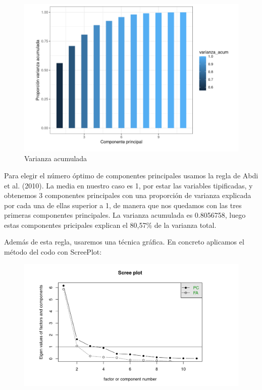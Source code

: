 \documentclass[11pt,a4paper]{article}
\begin{document}
    	         	\begin{figure}[H]
    	    \centering
    	    \includegraphics[scale=0.5]{varacum.png}
    	    \caption{Varianza acumulada}
    	    \label{varacum}
    	\end{figure}
    	
    	
    Para elegir el número óptimo de componentes principales usamos la regla de Abdi et al. (2010). La media en nuestro caso es 1, por estar las variables tipificadas, y obtenemos 3 componentes principales con una proporción de varianza explicada por cada una de ellas superior a 1, de manera que nos quedamos con las tres primeras componentes principales. La varianza acumulada es 0.8056758, luego estas componentes pricipales explican el 80,57\% de la varianza total. 
    
    Además de esta regla, usaremos una técnica gráfica. En concreto aplicamos el método del codo con ScreePlot: 
    
       	\begin{figure}[H]
    	    \centering
    	    \includegraphics[scale=0.4]{codo1.png}
    	    \caption{}
    	    \label{codo}
    	\end{figure}
    
\end{document}
